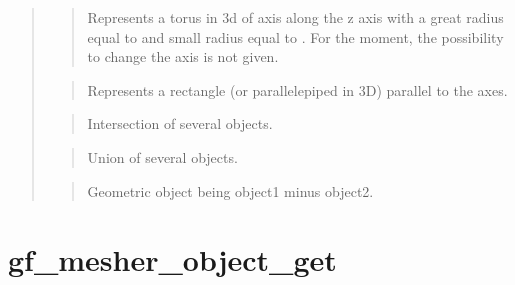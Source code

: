 \documentclass[a4paper,11pt,english]{sphinxmanual}
\begin{document}
\begin{quote}
\sphinxAtStartPar
{}
\begin{quote}

\sphinxAtStartPar
Represents a torus in 3d of axis along the z axis with a great radius
equal to  and small radius equal to . For the moment, the
possibility to change the axis is not given.
\end{quote}

\sphinxAtStartPar
{}
\begin{quote}

\sphinxAtStartPar
Represents a rectangle (or parallelepiped in 3D) parallel to the axes.
\end{quote}

\sphinxAtStartPar
{}
\begin{quote}

\sphinxAtStartPar
Intersection of several objects.
\end{quote}

\sphinxAtStartPar
{}
\begin{quote}

\sphinxAtStartPar
Union of several objects.
\end{quote}

\sphinxAtStartPar
{}
\begin{quote}

\sphinxAtStartPar
Geometric object being object1 minus object2.
\end{quote}
\end{quote}


\section{gf\_mesher\_object\_get}
\label{\detokenize{matlab_octave/cmdref_gf_mesher_object_get:gf-mesher-object-get}}\label{\detokenize{matlab_octave/cmdref_gf_mesher_object_get::doc}}
\sphinxAtStartPar
{}
\end{document}
